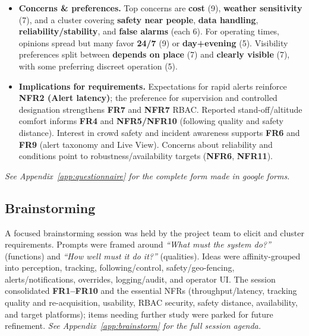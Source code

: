 \documentclass[12pt,a4paper]{report}
\begin{document}
\begin{itemize}[leftmargin=*]
\item \textbf{Concerns \& preferences.}
Top concerns are \textbf{cost} (9), \textbf{weather sensitivity} (7), and a cluster covering \textbf{safety near people}, \textbf{data handling}, \textbf{reliability/stability}, and \textbf{false alarms} (each 6). For operating times, opinions spread but many favor \textbf{24/7} (9) or \textbf{day+evening} (5). Visibility preferences split between \textbf{depends on place} (7) and \textbf{clearly visible} (7), with some preferring discreet operation (5).

\item \textbf{Implications for requirements.}
Expectations for rapid alerts reinforce \textbf{NFR2 (Alert latency)}; the preference for supervision and controlled designation strengthens \textbf{FR7} and \textbf{NFR7} \ac{RBAC}. Reported stand-off/altitude comfort informs \textbf{FR4} and \textbf{NFR5/NFR10} (following quality and safety distance). Interest in crowd safety and incident awareness supports \textbf{FR6} and \textbf{FR9} (alert taxonomy and Live View). Concerns about reliability and conditions point to robustness/availability targets (\textbf{NFR6}, \textbf{NFR11}).
\end{itemize}
\noindent\textit{See Appendix~\ref{app:questionnaire} for the complete form made in google forms.}



\subsection{Brainstorming}

A focused brainstorming session was held by the project team to elicit and cluster requirements. Prompts were framed around \textit{“What must the system do?”} (functions) and \textit{“How well must it do it?”} (qualities). Ideas were affinity-grouped into perception, tracking, following/control, safety/geo-fencing, alerts/notifications, overrides, logging/audit, and operator \ac{UI}. The session consolidated \textbf{FR1–FR10} and the essential NFRs (throughput/latency, tracking quality and re-acquisition, usability, \ac{RBAC} security, safety distance, availability, and target platforms); items needing further study were parked for future refinement.
\noindent\textit{See Appendix~\ref{app:brainstorm} for the full session agenda.}



\end{document}

